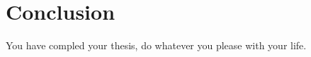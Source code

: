 \chapter{Conclusion} \label{chapter:conclusion}

You have compled your thesis, do whatever you please with your life.